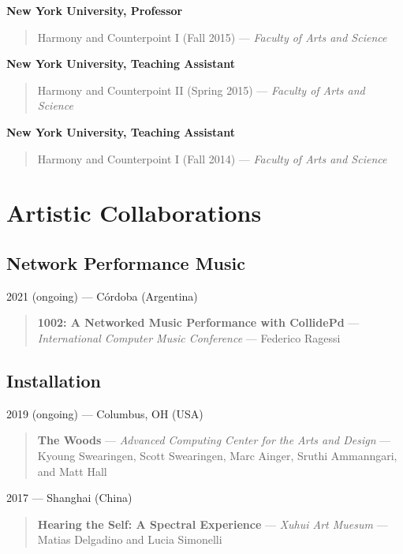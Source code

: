 \documentclass[12pt,overlapped]{res}%
\begin{document}
\begin{resume}
\textbf{New York University, Professor}
\begin{quote}
Harmony and Counterpoint I (Fall 2015) --- 
\textit{Faculty of Arts and Science}
\end{quote}%
%
%
%

\textbf{New York University, Teaching Assistant}
\begin{quote}
Harmony and Counterpoint II (Spring 2015) --- 
\textit{Faculty of Arts and Science}
\end{quote}%
%
%
%

\textbf{New York University, Teaching Assistant}
\begin{quote}
Harmony and Counterpoint I (Fall 2014) --- 
\textit{Faculty of Arts and Science}
\end{quote}%
\section{Artistic Collaborations}%
%
%
%
\subsection{Network Performance Music}%
2021 (ongoing) --- Córdoba (Argentina)%
\begin{quote}
\textbf{1002: A Networked Music Performance with CollidePd} --- \textit{International Computer Music Conference} --- Federico Ragessi
\end{quote}%
%
%
%
\subsection{Installation}%
2019 (ongoing) --- Columbus, OH (USA)%
\begin{quote}
\textbf{The Woods} --- \textit{Advanced Computing Center for the Arts and Design} --- Kyoung Swearingen, Scott Swearingen, Marc Ainger, Sruthi Ammanngari, and Matt Hall
\end{quote}%
%
%
%
2017 --- Shanghai (China)%
\begin{quote}
\textbf{Hearing the Self: A Spectral Experience} --- \textit{Xuhui Art Muesum} --- Matias Delgadino and Lucia Simonelli
\end{quote}%
%
%
%

\end{resume}
\end{document}
